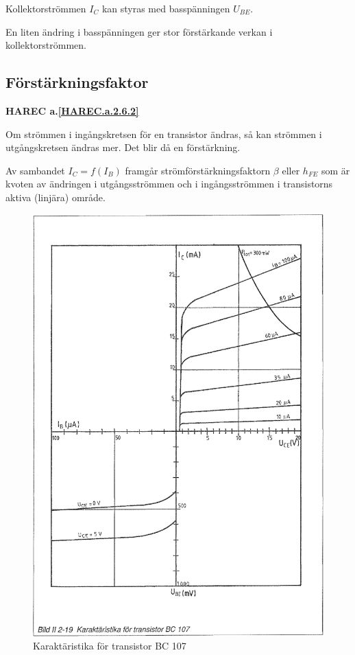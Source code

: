 Kollektorströmmen \(I_C\) kan styras med basspänningen \(U_{BE}\).

En liten ändring i basspänningen ger stor förstärkande verkan i
kollektorströmmen.

\subsection{Förstärkningsfaktor}
\textbf{HAREC a.\ref{HAREC.a.2.6.2}\label{myHAREC.a.2.6.2}}

Om strömmen i ingångskretsen för en transistor ändras, så kan strömmen i
utgångskretsen ändras mer. Det blir då en förstärkning.

Av sambandet \(I_C = f(I_B)\) framgår strömförstärkningsfaktorn \(\beta\) eller
\(h_{FE}\) som är kvoten av ändringen i utgångsströmmen och i ingångsströmmen i
transistorns aktiva (linjära) område.

\begin{figure}[h]
\begin{center}
\includegraphics[width=14cm]{images/bild_2_2-19}
\caption{Karaktäristika för transistor BC 107}
\label{fig:BildII2-19}
\end{center}
\end{figure}

